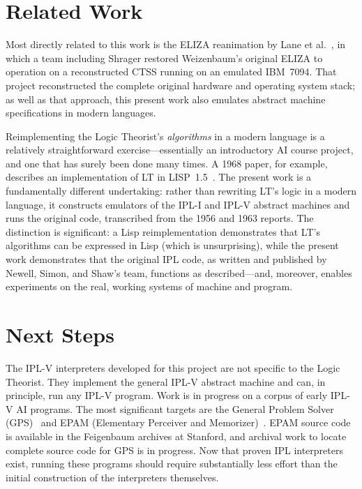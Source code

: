 \documentclass[journal]{IEEEtran}
\begin{document}
\section{Related Work}
\label{sec:related}

Most directly related to this work
is the ELIZA reanimation by Lane
et al.~\cite{lane2025eliza}, in which a team including Shrager
restored Weizenbaum's original ELIZA to operation on a
reconstructed CTSS running on an emulated IBM~7094. That project
reconstructed the complete original hardware and operating system
stack; as well as that approach, this present work also emulates 
abstract machine specifications in modern languages.

Reimplementing the Logic Theorist's \textit{algorithms} in a modern
language is a relatively straightforward exercise---essentially an
introductory AI course project, and one that has surely been done many
times. A 1968 paper, for example, describes an implementation of LT in
LISP~1.5~\cite{millstein1968logic}. The present work is a
fundamentally different undertaking: rather than rewriting LT's logic
in a modern language, it constructs emulators of the IPL-I
and IPL-V abstract machines and runs the original code, transcribed
from the 1956 and 1963 reports. The distinction is
significant: a Lisp reimplementation demonstrates that LT's algorithms
can be expressed in Lisp (which is unsurprising), while the present
work demonstrates that the original IPL code, as written and published
by Newell, Simon, and Shaw's team, functions as described---and,
moreover, enables experiments on the real, working systems of machine
and program.

\section{Next Steps}
\label{sec:next}

The IPL-V interpreters developed for this project are not specific to
the Logic Theorist. They implement the general IPL-V abstract machine
and can, in principle, run any IPL-V program. Work is in progress on
a corpus of early IPL-V AI programs. The most significant targets are
the General Problem Solver (GPS)~\cite{newell1959gps} and EPAM
(Elementary Perceiver and Memorizer)~\cite{feigenbaum1961epam}. 
EPAM source code is available in the Feigenbaum archives at Stanford, and
archival work to locate complete source code for GPS is in progress.
Now that proven IPL interpreters exist, running these programs should
require substantially less effort than the initial construction of
the interpreters themselves.
\end{document}
